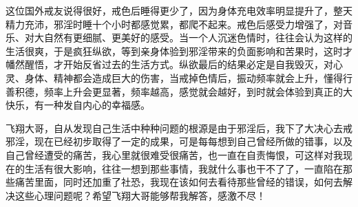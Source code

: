 \begin{case}
    这位国外戒友说得很好，戒色后睡得更少了，因为身体充电效率明显提升了，整天精力充沛，邪淫时睡十个小时都感觉累，都爬不起来。戒色后感受力增强了，对音乐、对大自然有更细腻、更美好的感受。当一个人沉迷色情时，往往会认为这样的生活很爽，于是疯狂纵欲，等到亲身体验到邪淫带来的负面影响和苦果时，这时才幡然醒悟，才开始反省过去的生活方式。纵欲最后的结果必定是自我毁灭，对心灵、身体、精神都会造成巨大的伤害，当戒掉色情后，振动频率就会上升，懂得行善积德，频率上升会更显著，频率越高，感觉就会越好，到时就会体验到真正的大快乐，有一种发自内心的幸福感。
\end{case}

\begin{case}
    飞翔大哥，自从发现自己生活中种种问题的根源是由于邪淫后，我下了大决心去戒邪淫，现在已经初步取得了一定的成果，可是每每想到自己曾经所做的错事，以及自己曾经遭受的痛苦，我心里就很难受很痛苦，也一直在自责悔恨，可这样对我现在的生活有很大影响，往往一想到那些事情，我就什么事也干不了了，一直陷在那些痛苦里面，同时还加重了社恐，我现在该如何去看待那些曾经的错误，如何去解决这些心理问题呢？希望飞翔大哥能够帮我解答，感激不尽！


\end{case}
